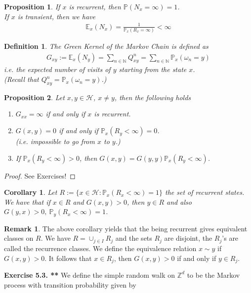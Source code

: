 \documentclass[11pt,a4paper, final]{article}
\newtheorem{prop}{Proposition}[section]
\newtheorem{cor}{Corollary}[section]
\newtheorem{defn}{Definition}[section]
\theoremstyle{definition}
\newtheorem{rem}{Remark}[section]
\begin{document}
\begin{prop} If $x$ is recurrent, then $\mathbb{P}(N_x = \infty) =1$. \\  If $x$ is transient, then we have 
\begin{align*}
\mathbb{E}_x ( N_x)= \frac{1}{\mathbb{P}_x(R_x = \infty)} < \infty 
\end{align*}
\end{prop}
\begin{defn} The Green Kernel of the Markov Chain is defined as
\begin{align*}
G_{xy}:= \mathbb{E}_x ( N_y) = \sum_{n \in \mathbb{N}} Q_{xy}^n = \sum_{n \in \mathbb{N}} \mathbb{P}_x ( \omega_n =y) 
\end{align*}
i.e. the expected number of visits of $y$ starting from the state $x$. \\ (Recall that $Q_{xy}^n = \mathbb{P}_x( \omega_n =y)$.)
\end{defn}
\begin{prop} Let $x,y \in \mathcal{H}$, $x \neq y$, then the following holds
\begin{enumerate}
\item $G_{xx}= \infty$ if and only if $x$ is recurrent.
\item $G(x,y)=0$ if and only if $\mathbb{P}_x (R_y < \infty) =0$. 
\\  (i.e. impossible to go from $x$ to $y$.)
\item If $\mathbb{P}_x( R_y < \infty) >0$, then $G(x,y)= G(y,y) \mathbb{P}_x( R_y < \infty)$.
\end{enumerate}
\end{prop}
\begin{proof}
See Exercises!
\end{proof}
\newpage
\begin{cor}
Let $R:= \lbrace x \in \mathcal{H} : \mathbb{P}_x ( R_x < \infty) = 1 \rbrace$ the set of recurrent states. We have that if $x \in R$ and $G(x,y) > 0$, then $y \in R$ and also $G(y,x)>0,  \ \mathbb{P}_y(R_x < \infty ) =1$. 
\end{cor}
\begin{rem} The above corollary yields that the being recurrent gives equivalent classes on $R$. We have $R = \cup_{j \in I} R_j$ and the sets $R_j$ are disjoint, the $R_j$'s are called the recurrence classes. We define the equivalence relation $x \sim y$ if $G(x,y) >0$. It follows that $x \in R_j$, then $G(x,y) >0$ if and only if $y \in R_j$. 
\end{rem}
\noindent \textbf{Exercise 5.3. **} We define the simple random walk on $\mathbb{Z}^d$ to be the Markov process with transition probability given by 
\end{document}
